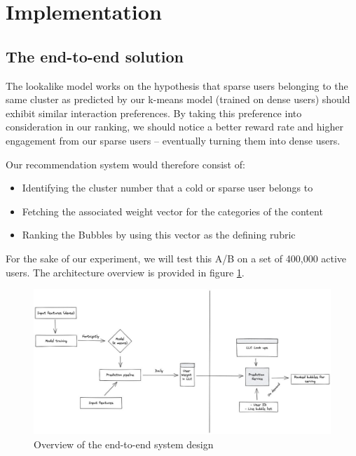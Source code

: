 \section{Implementation}

\subsection{The end-to-end solution}

The lookalike model works on the hypothesis that sparse users belonging to the same cluster as predicted by our k-means model (trained on dense users) should exhibit similar interaction preferences. By taking this preference into consideration in our ranking, we should notice a better reward rate and higher engagement from our sparse users – eventually turning them into dense users. 

Our recommendation system would therefore consist of: 

\begin{itemize}
    \item Identifying the cluster number that a cold or sparse user belongs to 
    \item Fetching the associated weight vector for the categories of the content 
    \item Ranking the Bubbles by using this vector as the defining rubric 
\end{itemize}

For the sake of our experiment, we will test this A/B on a set of 400,000 active users. The architecture overview is provided in figure \ref{fig:arch}.

\begin{figure}
  \centering
  \includegraphics[width=\textwidth]{figures/arch.jpeg}
  \caption[Architecture diagram of the end-to-end system]{Overview of the end-to-end system design}
  \label{fig:arch}
\end{figure}

